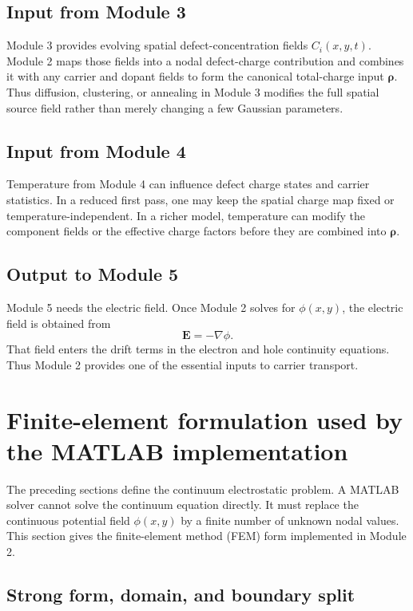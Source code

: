 \documentclass[11pt]{article}
\newcommand{\Evec}{\mathbf{E}}
\begin{document}
\subsection{Input from Module 3}

Module 3 provides evolving spatial defect-concentration fields $C_i(x,y,t)$. Module 2 maps those fields into a nodal defect-charge contribution and combines it with any carrier and dopant fields to form the canonical total-charge input $\bm{\rho}$. Thus diffusion, clustering, or annealing in Module 3 modifies the full spatial source field rather than merely changing a few Gaussian parameters.

\subsection{Input from Module 4}

Temperature from Module 4 can influence defect charge states and carrier statistics. In a reduced first pass, one may keep the spatial charge map fixed or temperature-independent. In a richer model, temperature can modify the component fields or the effective charge factors before they are combined into $\bm{\rho}$.

\subsection{Output to Module 5}

Module 5 needs the electric field. Once Module 2 solves for $\phi(x,y)$, the electric field is obtained from
\begin{equation}
\Evec = -\nabla \phi.
\end{equation}
That field enters the drift terms in the electron and hole continuity equations. Thus Module 2 provides one of the essential inputs to carrier transport.


\section{Finite-element formulation used by the MATLAB implementation}

The preceding sections define the continuum electrostatic problem. A MATLAB solver cannot solve the continuum equation directly. It must replace the continuous potential field $\phi(x,y)$ by a finite number of unknown nodal values. This section gives the finite-element method (FEM) form implemented in Module 2.

\subsection{Strong form, domain, and boundary split}
\end{document}
